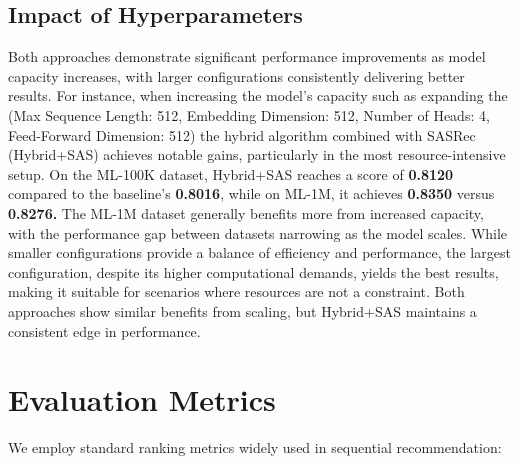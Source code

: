 \subsection{ Impact of Hyperparameters}
Both approaches demonstrate significant performance improvements as model capacity increases, with larger configurations consistently delivering better results. For instance, when increasing the model's capacity such as expanding the (Max Sequence Length: 512, Embedding Dimension: 512, Number of Heads: 4, Feed-Forward Dimension: 512) the hybrid algorithm combined with SASRec (Hybrid+SAS) achieves notable gains, particularly in the most resource-intensive setup. On the ML-100K dataset, Hybrid+SAS reaches a score of\textbf{ 0.8120} compared to the baseline's \textbf{0.8016}, while on ML-1M, it achieves \textbf{0.8350} versus \textbf{0.8276.} The ML-1M dataset generally benefits more from increased capacity, with the performance gap between datasets narrowing as the model scales. While smaller configurations provide a balance of efficiency and performance, the largest configuration, despite its higher computational demands, yields the best results, making it suitable for scenarios where resources are not a constraint. Both approaches show similar benefits from scaling, but Hybrid+SAS maintains a consistent edge in performance.
\section{Evaluation Metrics}
We employ standard ranking metrics widely used in sequential recommendation:

